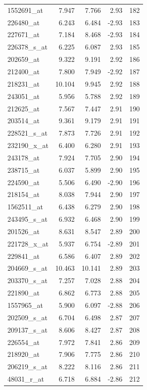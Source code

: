 \begin{footnotesize}
\begin{longtable}{lrrrr}
1552691\_at & 7.947 & 7.766 & 2.93 & 182 \\
226480\_at & 6.243 & 6.484 & -2.93 & 183 \\
227671\_at & 7.184 & 8.468 & -2.93 & 184 \\
226378\_s\_at & 6.225 & 6.087 & 2.93 & 185 \\
202659\_at & 9.322 & 9.191 & 2.92 & 186 \\
212400\_at & 7.800 & 7.949 & -2.92 & 187 \\
218231\_at & 10.104 & 9.945 & 2.92 & 188 \\
243051\_at & 5.956 & 5.788 & 2.92 & 189 \\
212625\_at & 7.567 & 7.447 & 2.91 & 190 \\
203514\_at & 9.361 & 9.179 & 2.91 & 191 \\
228521\_s\_at & 7.873 & 7.726 & 2.91 & 192 \\
232190\_x\_at & 6.400 & 6.280 & 2.91 & 193 \\
243178\_at & 7.924 & 7.705 & 2.90 & 194 \\
238715\_at & 6.037 & 5.899 & 2.90 & 195 \\
224590\_at & 5.506 & 6.490 & -2.90 & 196 \\
218154\_at & 8.038 & 7.944 & 2.90 & 197 \\
1562511\_at & 6.438 & 6.279 & 2.90 & 198 \\
243495\_s\_at & 6.932 & 6.468 & 2.90 & 199 \\
201526\_at & 8.631 & 8.547 & 2.89 & 200 \\
221728\_x\_at & 5.937 & 6.754 & -2.89 & 201 \\
229841\_at & 6.586 & 6.407 & 2.89 & 202 \\
204669\_s\_at & 10.463 & 10.141 & 2.89 & 203 \\
203370\_s\_at & 7.257 & 7.028 & 2.88 & 204 \\
221890\_at & 6.862 & 6.773 & 2.88 & 205 \\
1557965\_at & 5.900 & 6.097 & -2.88 & 206 \\
202509\_s\_at & 6.704 & 6.498 & 2.87 & 207 \\
209137\_s\_at & 8.606 & 8.427 & 2.87 & 208 \\
226554\_at & 7.972 & 7.841 & 2.86 & 209 \\
218920\_at & 7.906 & 7.775 & 2.86 & 210 \\
206219\_s\_at & 8.222 & 8.116 & 2.86 & 211 \\
48031\_r\_at & 6.718 & 6.884 & -2.86 & 212 \\

\end{longtable}
\end{footnotesize}
